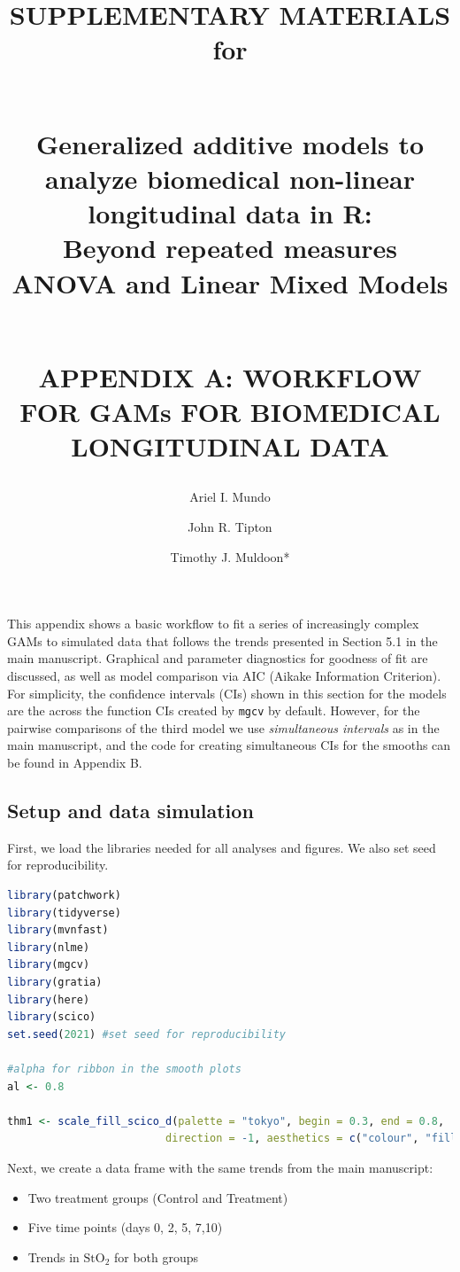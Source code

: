 \documentclass[
]{article}
\author{Ariel I. Mundo \orcidaffila{}}
\author{John R. Tipton \orcidaffilb{}}
\author{Timothy J. Muldoon*}
\affil{tmuldoon@uark.edu}
\title{SUPPLEMENTARY MATERIALS for\\
\strut \\
\textbf{Generalized additive models to analyze biomedical non-linear longitudinal data in R:}\\
Beyond repeated measures ANOVA and Linear Mixed Models\\
\strut \\
APPENDIX A: WORKFLOW FOR GAMs FOR BIOMEDICAL LONGITUDINAL DATA}
\author{}
\date{\vspace{-2.5em}}
\newcommand{\passthrough}[1]{#1}
\providecommand{\tightlist}{%
  \setlength{\itemsep}{0pt}\setlength{\parskip}{0pt}}
\begin{document}
\maketitle

\newpage


This appendix shows a basic workflow to fit a series of increasingly complex GAMs to simulated data that follows the trends presented in Section 5.1 in the main manuscript. Graphical and parameter diagnostics for goodness of fit are discussed, as well as model comparison via AIC (Aikake Information Criterion). For simplicity, the confidence intervals (CIs) shown in this section for the models are the across the function CIs created by \passthrough{\lstinline!mgcv!} by default. However, for the pairwise comparisons of the third model we use \emph{simultaneous intervals} as in the main manuscript, and the code for creating simultaneous CIs for the smooths can be found in Appendix B.

\hypertarget{setup-and-data-simulation}{%
\subsection{Setup and data simulation}\label{setup-and-data-simulation}}

First, we load the libraries needed for all analyses and figures. We also set seed for reproducibility.

\begin{lstlisting}[language=R]
library(patchwork)
library(tidyverse)
library(mvnfast)
library(nlme)
library(mgcv)
library(gratia)
library(here)
library(scico)
set.seed(2021) #set seed for reproducibility

#alpha for ribbon in the smooth plots
al <- 0.8

thm1 <- scale_fill_scico_d(palette = "tokyo", begin = 0.3, end = 0.8,
                         direction = -1, aesthetics = c("colour", "fill"))
\end{lstlisting}

Next, we create a data frame with the same trends from the main manuscript:

\begin{itemize}
\tightlist
\item
  Two treatment groups (Control and Treatment)
\item
  Five time points (days 0, 2, 5, 7,10)
\item
  Trends in \(\mbox{StO}_2\) for both groups
\end{itemize}
\end{document}
